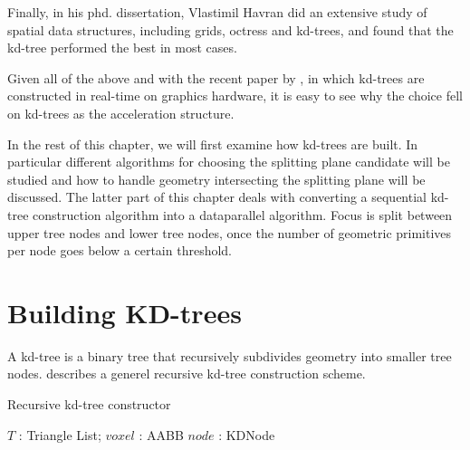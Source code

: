 Finally, in his phd. dissertation, Vlastimil Havran did an extensive
study of spatial data structures, including grids, octress and
kd-trees, and found that the kd-tree performed the best in most cases.

Given all of the above and with the recent paper by \zhou{}, in which
kd-trees are constructed in real-time on graphics hardware, it is easy
to see why the choice fell on kd-trees as the acceleration structure.


In the rest of this chapter, we will first examine how kd-trees are
built. In particular different algorithms for choosing the splitting
plane candidate will be studied and how to handle geometry
intersecting the splitting plane will be discussed. The latter part of
this chapter deals with converting a sequential kd-tree construction
algorithm into a dataparallel algorithm. Focus is split between upper
tree nodes and lower tree nodes, once the number of geometric
primitives per node goes below a certain threshold.

\section{Building KD-trees}

A kd-tree is a binary tree that recursively subdivides geometry into
smaller tree nodes.  describes a generel
recursive kd-tree construction scheme.

\begin{algorithm}
  \caption{Recursive kd-tree constructor}
  \label{alg:kdTreeCreator}
  \begin{algorithmic}
              {$T$ : Triangle List; $voxel$ : AABB}
              {$node$ : KDNode}
              {
                \ELSE
                \ENDIF}
  \end{algorithmic}
\end{algorithm}

